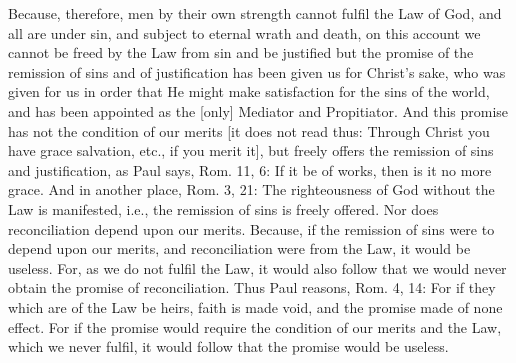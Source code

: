 Because, therefore, men by their own strength cannot fulfil the Law
of God, and all are under sin, and subject to eternal wrath and death,
on this account we cannot be freed by the Law from sin and be
justified but the promise of the remission of sins and of
justification has been given us for Christ's sake, who was given for
us in order that He might make satisfaction for the sins of the world,
and has been appointed as the [only] Mediator and Propitiator.  And
this promise has not the condition of our merits [it does not read
thus: Through Christ you have grace salvation, etc., if you merit it],
but freely offers the remission of sins and justification, as Paul
says, Rom. 11, 6: If it be of works, then is it no more grace.  And
in another place, Rom. 3, 21: The righteousness of God without the
Law is manifested, i.e., the remission of sins is freely offered.
Nor does reconciliation depend upon our merits.  Because, if the
remission of sins were to depend upon our merits, and reconciliation
were from the Law, it would be useless.  For, as we do not fulfil the
Law, it would also follow that we would never obtain the promise of
reconciliation.  Thus Paul reasons, Rom. 4, 14: For if they which are
of the Law be heirs, faith is made void, and the promise made of none
effect.  For if the promise would require the condition of our merits
and the Law, which we never fulfil, it would follow that the promise
would be useless.

